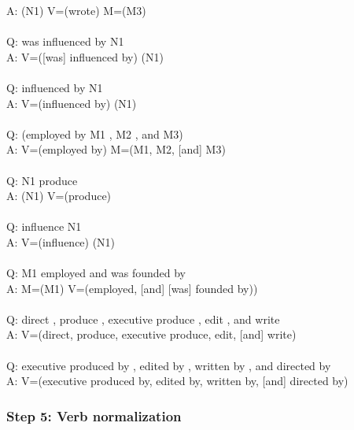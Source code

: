 \documentclass{article} \usepackage{iclr2022_conference,times}
\begin{document}
{A: (N1) V=(wrote) M=(M3) \\
 \\
Q: was influenced by N1 \\
A: V=([was] influenced by) (N1) \\
 \\
Q: influenced by N1 \\
A: V=(influenced by) (N1) \\
 \\
Q: (employed by M1 , M2 , and M3) \\
A: V=(employed by) M=(M1, M2, [and] M3) \\
 \\
Q: N1 produce \\
A: (N1) V=(produce) \\
 \\
Q: influence N1 \\
A: V=(influence) (N1) \\
 \\
Q: M1 employed and was founded by \\
A: M=(M1) V=(employed, [and] [was] founded by)) \\
 \\
Q: direct , produce , executive produce , edit , and write \\
A: V=(direct, produce, executive produce, edit, [and] write) \\
 \\
Q: executive produced by , edited by , written by , and directed by \\
A: V=(executive produced by, edited by, written by, [and] directed by)}

\subsubsection{Step 5: Verb normalization}
\end{document}
